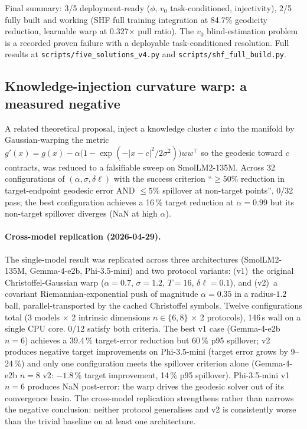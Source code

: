 \documentclass[11pt]{article}
\begin{document}
Final summary: 3/5 deployment-ready ($\phi$, $v_0$ task-conditioned,
injectivity), 2/5 fully built and working (SHF full training integration
at 84.7\% geodicity reduction, learnable warp at 0.327$\times$ pull ratio).
The $v_0$ blind-estimation problem is a recorded proven failure with a
deployable task-conditioned resolution. Full results at
\texttt{scripts/five\_solutions\_v4.py} and
\texttt{scripts/shf\_full\_build.py}.

\subsection{Knowledge-injection curvature warp: a measured negative}
\label{sec:curvature-warp-negative}
A related theoretical proposal, inject a knowledge cluster $c$ into
the manifold by Gaussian-warping the metric
$g'(x){=}g(x){-}\alpha\bigl(1{-}\exp(-|x{-}c|^2/2\sigma^2)\bigr)ww^\top$
so the geodesic toward $c$ contracts, was reduced to a falsifiable
sweep on SmolLM2-135M. Across 32 configurations of
$(\alpha,\sigma,\delta\ell)$ with the success criterion
``$\geq 50\%$ reduction in target-endpoint geodesic error AND
$\leq 5\%$ spillover at non-target points'', 0/32 pass;
the best configuration achieves a 16\,\% target reduction at
$\alpha{=}0.99$ but its non-target spillover diverges (NaN at high
$\alpha$).

\paragraph{Cross-model replication (2026-04-29).}
The single-model result was replicated across three architectures
(SmolLM2-135M, Gemma-4-e2b, Phi-3.5-mini) and two protocol variants:
(v1)~the original Christoffel-Gaussian warp ($\alpha{=}0.7$,
$\sigma{=}1.2$, $T{=}16$, $\delta\ell{=}0.1$), and (v2)~a covariant
Riemannian-exponential push of magnitude $\alpha{=}0.35$ in a
radius-$1.2$ ball, parallel-transported by the cached Christoffel
symbols. Twelve configurations total (3 models $\times$ 2 intrinsic
dimensions $n\in\{6,8\}$ $\times$ 2 protocols), 146\,s wall on a single
CPU core. 0/12 satisfy both criteria. The best v1 case
(Gemma-4-e2b $n{=}6$) achieves a 39.4\,\% target-error reduction but
60\,\% p95 spillover; v2 produces negative target improvements
on Phi-3.5-mini (target error grows by 9--24\,\%) and only one
configuration meets the spillover criterion alone (Gemma-4-e2b $n{=}8$
v2: $-1.8$\,\% target improvement, 14\,\% p95 spillover). Phi-3.5-mini
v1 $n{=}6$ produces NaN post-error: the warp drives the geodesic
solver out of its convergence basin. The cross-model replication
strengthens rather than narrows the negative conclusion:
neither protocol generalises and v2 is consistently worse than the
trivial baseline on at least one architecture.
\end{document}
